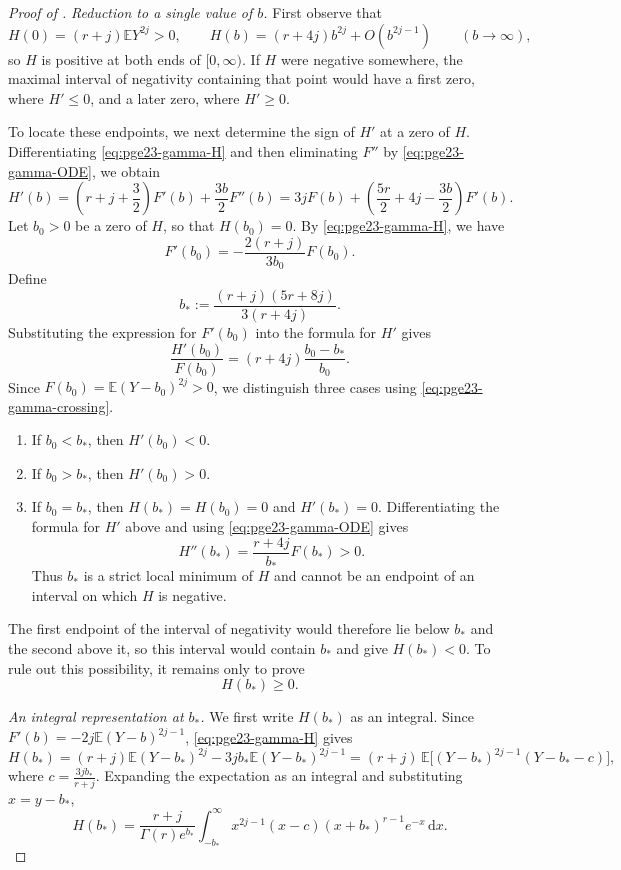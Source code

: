 \documentclass[11pt]{article}
\theoremstyle{remark}
\numberwithin{equation}{section}
\newcommand{\dd}{\,\mathrm d}
\newcommand{\E}{\mathbb E}
\begin{document}
\begin{proof}[Proof of ]
  \smallskip
  \noindent\emph{Reduction to a single value of $b$.}
  First observe that
  \[
    H(0)=(r+j)\E Y^{2j}>0,
    \qquad
    H(b)=(r+4j)b^{2j}+O(b^{2j-1})
    \qquad(b\to\infty),
  \]
  so $H$ is positive at both ends of $[0,\infty)$.
  If $H$ were negative somewhere, the maximal interval of negativity containing that point
  would have a first zero, where $H'\le0$, and a later zero, where
  $H'\ge0$.

  To locate these endpoints, we next determine the sign of $H'$ at a zero of $H$.
  Differentiating \eqref{eq:pge23-gamma-H} and then eliminating $F''$ by \eqref{eq:pge23-gamma-ODE}, we obtain
  \[
    H'(b)=\left(r+j+\frac{3}{2}\right)F'(b)+\frac{3b}{2}F''(b)
    =3jF(b)+\left(\frac{5r}{2}+4j-\frac{3b}{2}\right)F'(b).
  \]
  Let $b_0>0$ be a zero of $H$, so that $H(b_0)=0$. By \eqref{eq:pge23-gamma-H}, we have
  \[
    F'(b_0)=-\frac{2(r+j)}{3b_0}F(b_0).
  \]
  Define
  \begin{equation*}
    b_*:=\frac{(r+j)(5r+8j)}{3(r+4j)}.
  \end{equation*}
  Substituting the expression for $F'(b_0)$ into the formula for $H'$
  gives
  \begin{equation}\label{eq:pge23-gamma-crossing}
    \frac{H'(b_0)}{F(b_0)}
    =(r+4j)\frac{b_0-b_*}{b_0}.
  \end{equation}
  Since $F(b_0)=\E(Y-b_0)^{2j}>0$, we distinguish three cases using
  \eqref{eq:pge23-gamma-crossing}.
  \begin{enumerate}[label=(\roman*)]
    \item If $b_0<b_*$, then $H'(b_0)<0$.
    \item If $b_0>b_*$, then $H'(b_0)>0$.
    \item If $b_0=b_*$, then $H(b_*)=H(b_0)=0$ and $H'(b_*)=0$.
    Differentiating the formula for $H'$ above and using
    \eqref{eq:pge23-gamma-ODE} gives
    \[
      H''(b_*)=\frac{r+4j}{b_*}F(b_*)>0.
    \]
    Thus $b_*$ is a strict local minimum of $H$ and cannot be an endpoint
    of an interval on which $H$ is negative.
  \end{enumerate}
  The first endpoint of the interval of negativity would therefore lie below $b_*$
  and the second above it,
  so this interval would contain $b_*$ and give $H(b_*)<0$.
  To rule out this possibility, it remains only to prove
  \begin{equation}\label{eq:pge23-gamma-Hbstar}
    H(b_*)\ge0.
  \end{equation}

  \smallskip
  \noindent\emph{An integral representation at $b_*$.}
  We first write $H(b_*)$ as an integral.
  Since $F'(b)=-2j\E(Y-b)^{2j-1}$, \eqref{eq:pge23-gamma-H} gives
  \[
    H(b_*)=(r+j)\E(Y-b_*)^{2j}-3jb_*\E(Y-b_*)^{2j-1}
    =(r+j)\,\E\bigl[(Y-b_*)^{2j-1}(Y-b_*-c)\bigr],
  \]
  where $c=\frac{3jb_*}{r+j}$.
  Expanding the expectation as an integral and substituting $x=y-b_*$,
  \begin{equation}\label{eq:pge23-gamma-H-integral}
    H(b_*) =\frac{r+j}{\Gamma(r) e^{b_*}}\int_{-b_*}^{\infty}
    x^{2j-1}(x-c)(x+b_*)^{r-1}e^{-x}\dd x.
  \end{equation}


\end{proof}
\end{document}

